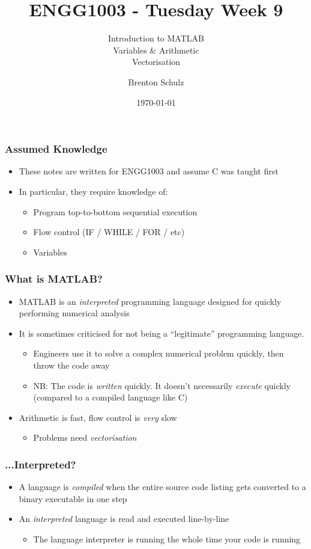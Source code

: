 \documentclass[14pt]{beamer}
\title{ENGG1003 - Tuesday Week 9}
\subtitle{Introduction to MATLAB\\Variables \& Arithmetic\\Vectorisation}
\author{Brenton Schulz}
\institute{University of Newcastle}
\date{\today}
\begin{document}
\titlepage

\begin{frame}
\frametitle{Assumed Knowledge}
\begin{itemize}
\item These notes are written for ENGG1003 and assume C was taught first
\item In particular, they require knowledge of:
	\begin{itemize}
		\item Program top-to-bottom sequential execution
		\item Flow control (IF / WHILE / FOR / etc)
		\item Variables
	\end{itemize}
\end{itemize}
\end{frame}

\begin{frame}
\frametitle{What is MATLAB?}
\begin{itemize}
\item MATLAB is an \textit{interpreted} programming language designed for quickly performing numerical analysis
\item It is sometimes criticised for not being a ``legitimate'' programming language.
	\begin{itemize}
		\item Engineers use it to solve a complex numerical problem quickly, then throw the code away
		\item NB: The code is \textit{written} quickly. It doesn't necessarily \textit{execute} quickly (compared to a compiled language like C)
	\end{itemize}
\item Arithmetic is fast, flow control is \textit{very} slow
\begin{itemize}
	\item Problems need \textit{vectorisation}
\end{itemize}
\end{itemize}
\end{frame}

\begin{frame}
\frametitle{...Interpreted?}
\begin{itemize}
\item A language is \textit{compiled} when the entire source code listing gets converted to a binary executable in one step
\item An \textit{interpreted} language is read and executed line-by-line
	\begin{itemize}
		\item The language interpreter is running the whole time your code is running
	\end{itemize}

\end{itemize}
\end{frame}
\end{document}
